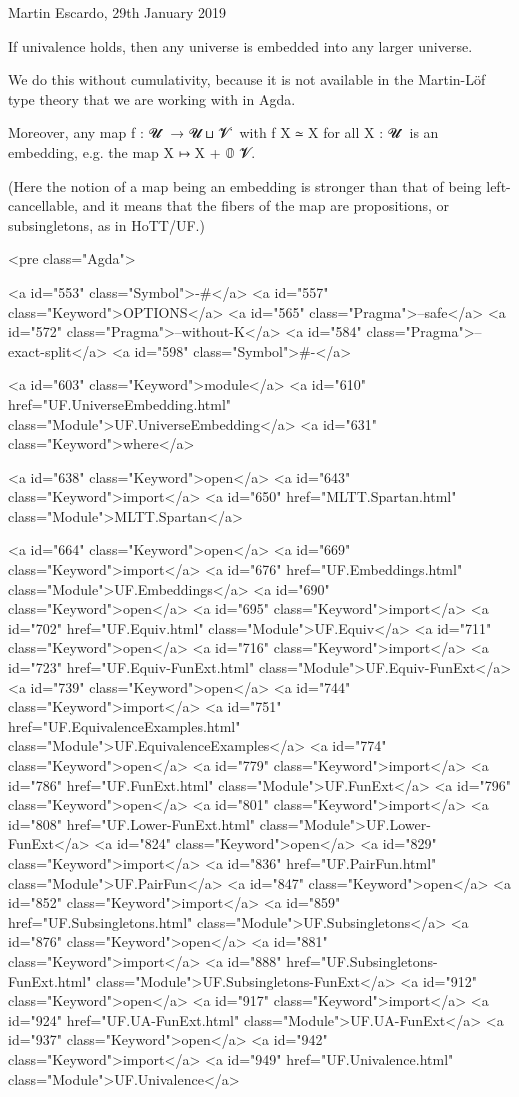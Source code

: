 Martin Escardo, 29th January 2019

If univalence holds, then any universe is embedded into any larger
universe.

We do this without cumulativity, because it is not available in the
Martin-Löf type theory that we are working with in Agda.

Moreover, any map f : 𝓤 ̇ → 𝓤 ⊔ 𝓥 ̇ with f X ≃ X for all X : 𝓤 ̇ is an
embedding, e.g. the map X ↦ X + 𝟘 {𝓥}.

(Here the notion of a map being an embedding is stronger than that of
being left-cancellable, and it means that the fibers of the map are
propositions, or subsingletons, as in HoTT/UF.)

<pre class="Agda">

<a id="553" class="Symbol">{-#</a> <a id="557" class="Keyword">OPTIONS</a> <a id="565" class="Pragma">--safe</a> <a id="572" class="Pragma">--without-K</a> <a id="584" class="Pragma">--exact-split</a> <a id="598" class="Symbol">#-}</a>

<a id="603" class="Keyword">module</a> <a id="610" href="UF.UniverseEmbedding.html" class="Module">UF.UniverseEmbedding</a> <a id="631" class="Keyword">where</a>

<a id="638" class="Keyword">open</a> <a id="643" class="Keyword">import</a> <a id="650" href="MLTT.Spartan.html" class="Module">MLTT.Spartan</a>

<a id="664" class="Keyword">open</a> <a id="669" class="Keyword">import</a> <a id="676" href="UF.Embeddings.html" class="Module">UF.Embeddings</a>
<a id="690" class="Keyword">open</a> <a id="695" class="Keyword">import</a> <a id="702" href="UF.Equiv.html" class="Module">UF.Equiv</a>
<a id="711" class="Keyword">open</a> <a id="716" class="Keyword">import</a> <a id="723" href="UF.Equiv-FunExt.html" class="Module">UF.Equiv-FunExt</a>
<a id="739" class="Keyword">open</a> <a id="744" class="Keyword">import</a> <a id="751" href="UF.EquivalenceExamples.html" class="Module">UF.EquivalenceExamples</a>
<a id="774" class="Keyword">open</a> <a id="779" class="Keyword">import</a> <a id="786" href="UF.FunExt.html" class="Module">UF.FunExt</a>
<a id="796" class="Keyword">open</a> <a id="801" class="Keyword">import</a> <a id="808" href="UF.Lower-FunExt.html" class="Module">UF.Lower-FunExt</a>
<a id="824" class="Keyword">open</a> <a id="829" class="Keyword">import</a> <a id="836" href="UF.PairFun.html" class="Module">UF.PairFun</a>
<a id="847" class="Keyword">open</a> <a id="852" class="Keyword">import</a> <a id="859" href="UF.Subsingletons.html" class="Module">UF.Subsingletons</a>
<a id="876" class="Keyword">open</a> <a id="881" class="Keyword">import</a> <a id="888" href="UF.Subsingletons-FunExt.html" class="Module">UF.Subsingletons-FunExt</a>
<a id="912" class="Keyword">open</a> <a id="917" class="Keyword">import</a> <a id="924" href="UF.UA-FunExt.html" class="Module">UF.UA-FunExt</a>
<a id="937" class="Keyword">open</a> <a id="942" class="Keyword">import</a> <a id="949" href="UF.Univalence.html" class="Module">UF.Univalence</a>

